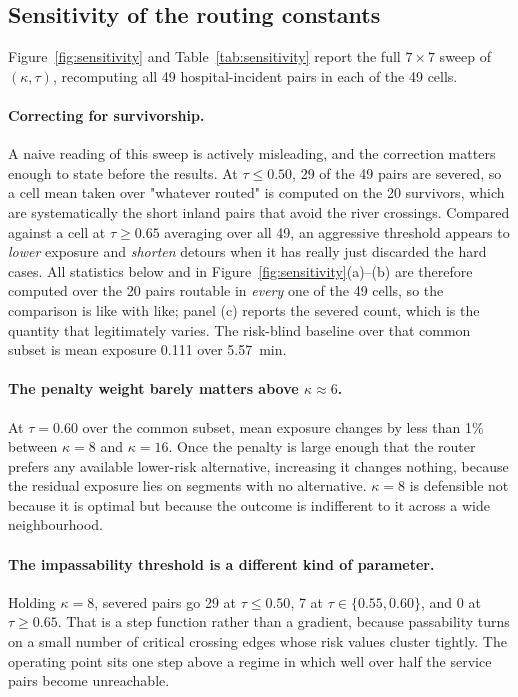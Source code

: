 \documentclass[11pt,a4paper]{article}
\begin{document}
\subsection{Sensitivity of the routing constants}
\label{sec:res-sensitivity}

Figure~\ref{fig:sensitivity} and Table~\ref{tab:sensitivity} report the full
$7\times7$ sweep of $(\kappa,\tau)$, recomputing all 49 hospital-incident pairs
in each of the 49 cells.

\paragraph{Correcting for survivorship.} A naive reading of this sweep is
actively misleading, and the correction matters enough to state before the
results. At $\tau\le0.50$, 29 of the 49 pairs are severed, so a cell mean taken
over "whatever routed" is computed on the 20 survivors, which are systematically
the short inland pairs that avoid the river crossings. Compared against a cell at
$\tau\ge0.65$ averaging over all 49, an aggressive threshold appears to
\emph{lower} exposure and \emph{shorten} detours when it has really just discarded
the hard cases. All statistics below and in
Figure~\ref{fig:sensitivity}(a)--(b) are therefore computed over the 20 pairs
routable in \emph{every} one of the 49 cells, so the comparison is like with
like; panel (c) reports the severed count, which is the quantity that legitimately
varies. The risk-blind baseline over that common subset is mean exposure 0.111
over \SI{5.57}{\minute}.

\paragraph{The penalty weight barely matters above $\kappa\approx6$.}
At $\tau=0.60$ over the common subset, mean exposure changes by less than 1\%
between $\kappa=8$ and $\kappa=16$. Once the penalty is large enough that the
router prefers any available lower-risk alternative, increasing it changes
nothing, because the residual exposure lies on segments with no alternative.
$\kappa=8$ is defensible not because it is optimal but because the outcome is
indifferent to it across a wide neighbourhood.

\paragraph{The impassability threshold is a different kind of parameter.}
Holding $\kappa=8$, severed pairs go 29 at $\tau\le0.50$, 7 at
$\tau\in\{0.55,0.60\}$, and 0 at $\tau\ge0.65$. That is a step function rather
than a gradient, because passability turns on a small number of critical crossing
edges whose risk values cluster tightly. The operating point sits one step above
a regime in which well over half the service pairs become unreachable.
\end{document}
